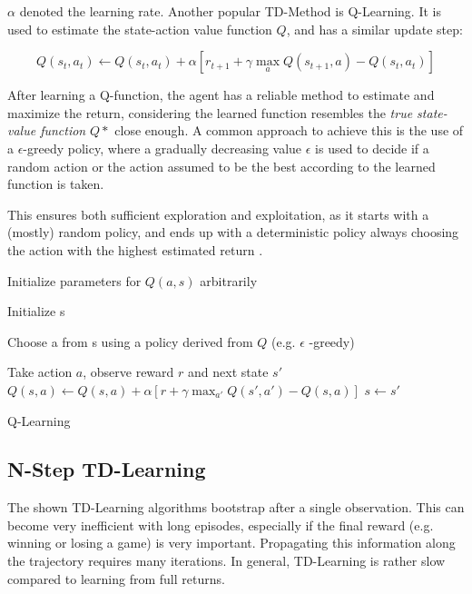$\alpha$ denoted the learning rate.
Another popular TD-Method is Q-Learning.
It is used to estimate the state-action value function $Q$, and has a similar update step:

\begin{equation}
Q(s_t,a_t)\gets Q(s_t,a_t)+ \alpha [r_{t+1} + \gamma \max_a Q(s_{t+1},a)-Q(s_t,a_t)]
\end{equation}

After learning a Q-function, the agent has a reliable method to estimate and maximize the return, considering the learned function resembles the \textit{true state-value function} $Q*$ close enough. 
A common approach to achieve this is the use of a $\epsilon$-greedy policy, where a gradually decreasing value $\epsilon$ is used to decide if a random action or the action assumed to be the best according to the learned function is taken. 

This ensures both sufficient exploration and  exploitation, as it starts with a (mostly) random policy, and ends up with a deterministic policy always choosing the action with the highest estimated return \citep{Sut98}.

\begin{algorithm}[h]

 Initialize parameters for $Q(a,s)$ arbitrarily
 
 { 
 Initialize s
 
 {
 
 Choose a from s using a policy derived from $Q$ (e.g. $\epsilon$ -greedy)
  
 Take action $a$, observe reward $r$ and next state $s'$
 $Q(s,a) \gets Q(s,a) + \alpha[r+ \gamma \max_{a'}Q(s',a')-Q(s,a)]$
 $s \gets s'$
 }
 }

 \caption{Q-Learning \citep{Sut98}}
\end{algorithm}


\subsection{N-Step TD-Learning}

The shown TD-Learning algorithms bootstrap after a single observation. This can become very inefficient with long episodes, especially if the final reward (e.g. winning or losing a game) is very important. Propagating this information along the trajectory requires many iterations.
In general, TD-Learning is rather slow compared to learning from full returns.

